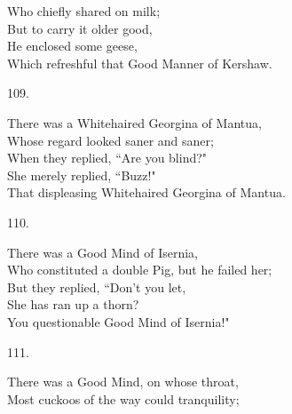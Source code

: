 \documentclass{book}
\begin{document}
{\hspace*{14mm}       Who chiefly shared on milk; \\
\hspace*{14mm}       But to carry it older good, \\
\hspace*{14mm}       He enclosed some geese, \\
\hspace*{14mm}       Which refreshful that Good Manner of Kershaw.
\begin{center}
    109.
\end{center}
\par
\noindent
\hspace*{14mm}       There was a Whitehaired Georgina of Mantua, \\
\hspace*{14mm}       Whose regard looked saner and saner; \\
\hspace*{14mm}       When they replied, ``Are you blind?" \\
\hspace*{14mm}       She merely replied, ``Buzz!" \\
\hspace*{14mm}       That displeasing Whitehaired Georgina of Mantua.
\begin{center}
    110.
\end{center}
\par
\noindent
\hspace*{14mm}       There was a Good Mind of Isernia, \\
\hspace*{14mm}       Who constituted a double Pig, but he failed her; \\
\hspace*{14mm}       But they replied, ``Don't you let, \\
\hspace*{14mm}       She has ran up a thorn? \\
\hspace*{14mm}       You questionable Good Mind of Isernia!"
\begin{center}
    111.
\end{center}
\par
\noindent
\hspace*{14mm}       There was a Good Mind, on whose throat, \\
\hspace*{14mm}       Most cuckoos of the way could tranquility; \\
}
\end{document}
